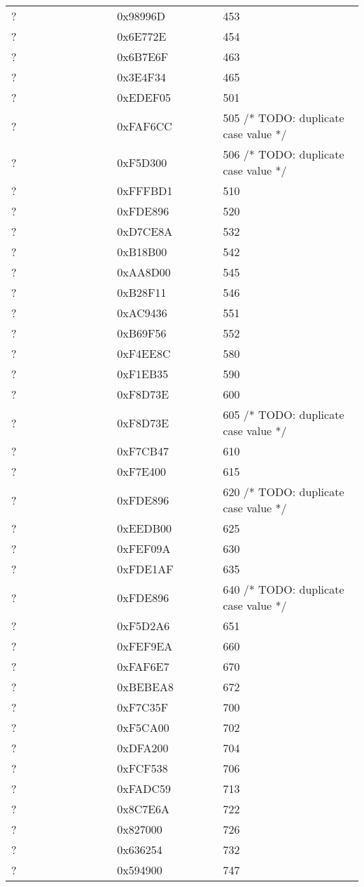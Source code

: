 \begin{longtable}{p{0.3\linewidth} p{0.3\linewidth} p{0.4\linewidth}}
? &  0x98996D &  453\\
? &  0x6E772E &  454\\
? &  0x6B7E6F &  463\\
? &  0x3E4F34 &  465\\
? &  0xEDEF05 &  501\\
? &  0xFAF6CC &  505 /* TODO: duplicate case value */\\
? &  0xF5D300 &  506 /* TODO: duplicate case value */\\
? &  0xFFFBD1 &  510\\
? &  0xFDE896 &  520\\
? &  0xD7CE8A &  532\\
? &  0xB18B00 &  542\\
? &  0xAA8D00 &  545\\
? &  0xB28F11 &  546\\
? &  0xAC9436 &  551\\
? &  0xB69F56 &  552\\
? &  0xF4EE8C &  580\\
? &  0xF1EB35 &  590\\
? &  0xF8D73E &  600\\
? &  0xF8D73E &  605 /* TODO: duplicate case value */\\
? &  0xF7CB47 &  610\\
? &  0xF7E400 &  615\\
? &  0xFDE896 &  620 /* TODO: duplicate case value */\\
? &  0xEEDB00 &  625\\
? &  0xFEF09A &  630\\
? &  0xFDE1AF &  635\\
? &  0xFDE896 &  640 /* TODO: duplicate case value */\\
? &  0xF5D2A6 &  651\\
? &  0xFEF9EA &  660\\
? &  0xFAF6E7 &  670\\
? &  0xBEBEA8 &  672\\
? &  0xF7C35F &  700\\
? &  0xF5CA00 &  702\\
? &  0xDFA200 &  704\\
? &  0xFCF538 &  706\\
? &  0xFADC59 &  713\\
? &  0x8C7E6A &  722\\
? &  0x827000 &  726\\
? &  0x636254 &  732\\
? &  0x594900 &  747\\

\end{longtable}
